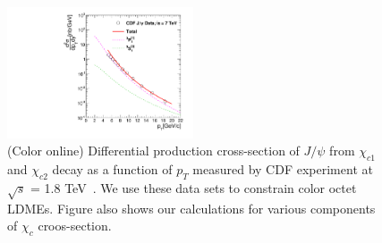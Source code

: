 \documentclass[aps,prc,preprint,superscriptaddress,showpacs,showkeys,amsmath]{revtex4-1}
\begin{document}




\begin{figure}
\includegraphics[width=0.49\textwidth]{Figures/Chic/Chic1_CDF_Fit.pdf}
\caption{(Color online) Differential production cross-section of $J/\psi$ from
$\chi_{c1}$ and $\chi_{c2}$ decay as a function of $p_{T}$ measured by CDF experiment at $\sqrt{s}$ = 1.8 TeV~\cite{Abe:1997yz}. 
We use these data sets to constrain color octet LDMEs. Figure also shows our calculations for various components 
of $\chi_{c}$ croos-section.}
\label{Fig:LDMEChicCDF}
\end{figure}
\end{document}
